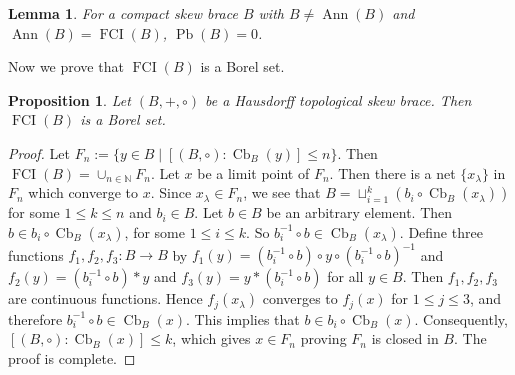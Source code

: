 \documentclass[oneside]{amsart}
\numberwithin{equation}{section}
\theoremstyle{plain}
\newtheorem{lemma}[equation]{Lemma}
\newtheorem{pro}[equation]{Proposition}
\theoremstyle{definition}
\newcommand{\Cb}{\operatorname{Cb} }
\newcommand{\Pb}{\operatorname{Pb} }
\newcommand{\Ann}{\operatorname{Ann} }
\newcommand{\FCI}{\operatorname{FCI}}
\begin{document}
\begin{lemma}
For a  compact  skew brace $B$ with $B \ne \Ann(B)$ and  $\Ann(B) = \FCI(B)$,  $\Pb(B) = 0$.
\end{lemma}

Now we prove that $\FCI(B)$ is a Borel set.
\begin{pro}
    Let $(B,+, \circ)$ be a Hausdorff topological skew brace. Then $\FCI(B)$ is a Borel set.
\end{pro}
\begin{proof}
     Let $F_n :=\{y \in B \mid [(B,\circ) : \Cb_B(y)]\leqslant n\}$.  Then $\FCI(B) = \cup_{n\in\mathbb{N}} F_n$. Let $x$ be a limit point of $F_n$. Then there is a net $\{x_\lambda\}$ in $F_n$ which converge to $x$. Since $x_\lambda\in F_n$, we see that  $B=\sqcup_{i=1}^{k}(b_i\circ\Cb_B(x_\lambda) )$ for some $1\leqslant k\leqslant n$ and $b_i\in B$. Let $b\in B$ be an arbitrary element. Then $b\in b_i\circ\Cb_B(x_\lambda)$, for some $1\leqslant i\leqslant k$. So $b_i^{-1}\circ b\in \Cb_B(x_\lambda)$. Define three functions $f_1, f_2, f_3 : B\rightarrow B$ by $f_1(y)=(b_i^{-1}\circ b)\circ y \circ (b_i^{-1}\circ b)^{-1}$ and $f_2(y)=(b_i^{-1}\circ b)\ast y$ and $f_3(y)=y\ast (b_i^{-1}\circ b)$ for all $y\in B$. Then $f_1,f_2,f_3$ are continuous functions. Hence $f_j(x_\lambda)$ converges to $f_j(x)$ for $1\leqslant j \leqslant 3$, and therefore $b_i^{-1}\circ b\in \Cb_B(x)$. This implies that $b\in b_i\circ\Cb_B(x)$. Consequently, $[(B,\circ):\Cb_B(x)]\leqslant k$, which gives  $x \in F_n$ proving $F_n$ is closed in $B$. The proof is complete.  
\end{proof}
\end{document}
